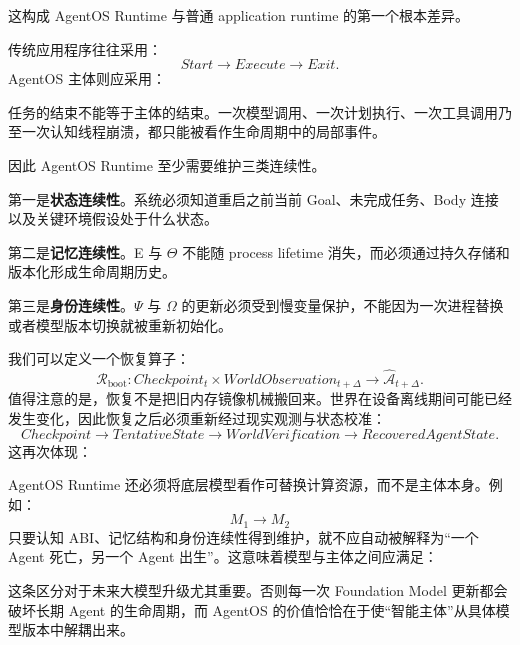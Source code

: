 这构成 AgentOS Runtime 与普通 application runtime 的第一个根本差异。

传统应用程序往往采用：
\[
Start\rightarrow Execute\rightarrow Exit.
\]
AgentOS 主体则应采用：
\begin{statementbox}
\centering
{}
\end{statementbox}
任务的结束不能等于主体的结束。一次模型调用、一次计划执行、一次工具调用乃至一次认知线程崩溃，都只能被看作生命周期中的局部事件。

因此 AgentOS Runtime 至少需要维护三类连续性。

第一是\textbf{状态连续性}。系统必须知道重启之前当前 Goal、未完成任务、Body 连接以及关键环境假设处于什么状态。

第二是\textbf{记忆连续性}。E 与 $\Theta$ 不能随 process lifetime 消失，而必须通过持久存储和版本化形成生命周期历史。

第三是\textbf{身份连续性}。$\Psi$ 与 $\Omega$ 的更新必须受到慢变量保护，不能因为一次进程替换或者模型版本切换就被重新初始化。

我们可以定义一个恢复算子：
\[
\mathcal R_{\mathrm{boot}}:
Checkpoint_t
\times
WorldObservation_{t+\Delta}
\rightarrow
\widehat{\mathcal A}_{t+\Delta}.
\]
值得注意的是，恢复不是把旧内存镜像机械搬回来。世界在设备离线期间可能已经发生变化，因此恢复之后必须重新经过现实观测与状态校准：
\[
Checkpoint
\rightarrow
TentativeState
\rightarrow
WorldVerification
\rightarrow
RecoveredAgentState.
\]
这再次体现：
\begin{statementbox}
\centering
{}
\end{statementbox}

AgentOS Runtime 还必须将底层模型看作可替换计算资源，而不是主体本身。例如：
\[
M_1\rightarrow M_2
\]
只要认知 ABI、记忆结构和身份连续性得到维护，就不应自动被解释为“一个 Agent 死亡，另一个 Agent 出生”。这意味着模型与主体之间应满足：
\begin{statementbox}
\centering
{}
\end{statementbox}

这条区分对于未来大模型升级尤其重要。否则每一次 Foundation Model 更新都会破坏长期 Agent 的生命周期，而 AgentOS 的价值恰恰在于使“智能主体”从具体模型版本中解耦出来。

